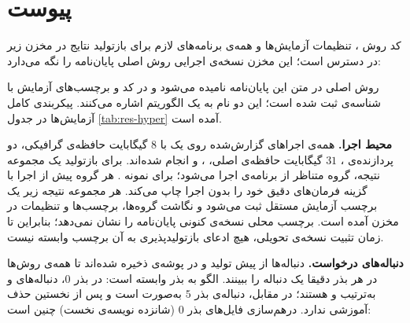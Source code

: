 \chapter*{پیوست}
\label{ch:appendix}
{}

کد روش ، تنظیمات آزمایش‌ها و همه‌ی برنامه‌های لازم برای بازتولید نتایج در مخزن زیر در دسترس است؛ این مخزن نسخه‌ی اجرایی روش اصلی پایان‌نامه را نگه می‌دارد:

\begin{center}
\end{center}

\noindent
روش اصلی در متن این پایان‌نامه  نامیده می‌شود و در کد و برچسب‌های آزمایش با شناسه‌ی  ثبت شده است؛ این دو نام به یک الگوریتم اشاره می‌کنند. پیکربندی کامل آزمایش‌ها در جدول \ref{tab:res-hyper} آمده است.



\smallskip
\noindent
\textbf{محیط اجرا.} همه‌ی اجراهای گزارش‌شده روی یک  با $8$ گیگابایت حافظه‌ی گرافیکی، دو پردازنده‌ی ، $31$ گیگابایت حافظه‌ی اصلی، ،  و  انجام شده‌اند. برای بازتولید یک مجموعه نتیجه، گروه متناظر از برنامه‌ی  اجرا می‌شود؛ برای نمونه . هر گروه پیش از اجرا با گزینه  فرمان‌های دقیق خود را بدون اجرا چاپ می‌کند. هر مجموعه نتیجه زیر یک برچسب آزمایش مستقل ثبت می‌شود و نگاشت گروه‌ها، برچسب‌ها و تنظیمات در  مخزن آمده است. برچسب محلی  نسخه‌ی کنونی پایان‌نامه را نشان نمی‌دهد؛ بنابراین تا زمان تثبیت نسخه‌ی تحویلی، هیچ ادعای بازتولیدپذیری به آن برچسب وابسته نیست.

\noindent
\textbf{دنباله‌های درخواست.} دنباله‌ها از پیش تولید و در پوشه‌ی  ذخیره شده‌اند تا همه‌ی روش‌ها در هر بذر دقیقا یک دنباله را ببینند. الگو به بذر وابسته است: در بذر $0$، دنباله‌های  و  به‌ترتیب  و  هستند؛ در مقابل، دنباله‌ی  بذر $5$ به‌صورت  است و پس از نخستین حذف آموزشی ندارد. درهم‌سازی  فایل‌های بذر $0$ (شانزده نویسه‌ی نخست) چنین است:

\begingroup
\small
\setlength{\parskip}{0pt}
\noindent{}\par
\vspace{-0.25\baselineskip}
\noindent{}\par
\endgroup
